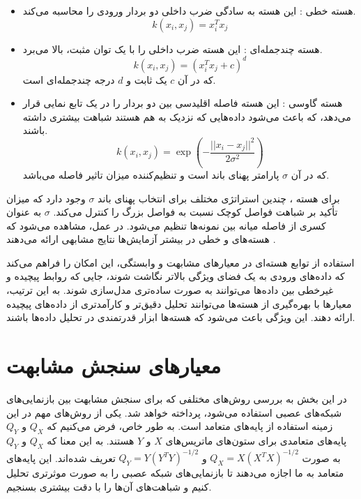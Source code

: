 \begin{itemize}
\item
هسته خطی%
:
این هسته به سادگی ضرب داخلی%
دو بردار ورودی را محاسبه می‌کند.
\begin{equation}
	k(x_i, x_j) = x_i^T x_j
\end{equation}
	
	
	
\item 
هسته چندجمله‌ای%
:
این هسته ضرب داخلی را با یک توان مثبت، بالا می‌برد.
\begin{equation}
	k(x_i, x_j) = (x_i^T x_j + c)^d
\end{equation}
که در آن \( c \) یک ثابت و \( d \) درجه چندجمله‌ای است.

	
\item
هسته گاوسی
%
:
این هسته فاصله اقلیدسی بین دو بردار را در یک تابع نمایی قرار می‌دهد، که باعث می‌شود داده‌هایی که نزدیک به هم هستند شباهت بیشتری داشته باشند.
\begin{equation}
	k(x_i, x_j) = \exp\left(-\frac{||x_i - x_j||^2}{2\sigma^2}\right)
\end{equation}
که در آن \( \sigma \) پارامتر پهنای باند است و تنظیم‌کننده میزان تاثیر فاصله می‌باشد.
\end{itemize}

برای هسته
%
، چندین استراتژی مختلف برای انتخاب پهنای باند \(\sigma\) وجود دارد که میزان تأکید بر شباهت فواصل کوچک نسبت به فواصل بزرگ را کنترل می‌کند. \(\sigma\) به عنوان کسری از فاصله میانه بین نمونه‌ها تنظیم می‌شود. در عمل، مشاهده می‌شود که هسته‌های
و خطی در بیشتر آزمایش‌ها نتایج مشابهی ارائه می‌دهند
\cite{kornblith2019similarity}.

استفاده از توابع هسته‌ای در معیارهای مشابهت و وابستگی، این امکان را فراهم می‌کند که داده‌های ورودی به یک فضای ویژگی بالاتر نگاشت شوند، جایی که روابط پیچیده و غیرخطی بین داده‌ها می‌توانند به صورت ساده‌تری مدل‌سازی شوند. به این ترتیب، معیارها با بهره‌گیری از هسته‌ها می‌توانند تحلیل دقیق‌تر و کارآمدتری از داده‌های پیچیده ارائه دهند. این ویژگی باعث می‌شود که هسته‌ها ابزار قدرتمندی در تحلیل داده‌ها باشند.



\section{معیار‌های سنجش مشابهت}
در این بخش به بررسی روش‌های مختلفی که برای سنجش مشابهت بین بازنمایی‌های شبکه‌های عصبی استفاده می‌شود، پرداخته خواهد شد. یکی از روش‌های مهم در این زمینه استفاده از پایه‌های متعامد است. به طور خاص، فرض می‌کنیم که \( Q_X \) و \( Q_Y \) پایه‌های متعامدی برای ستون‌های ماتریس‌های \( X \) و \( Y \) هستند. به این معنا که \( Q_X \) و \( Q_Y \) به صورت \( Q_X = X(X^T X)^{-1/2} \) و \( Q_Y = Y(Y^T Y)^{-1/2} \) تعریف شده‌اند. این پایه‌های متعامد به ما اجازه می‌دهند تا بازنمایی‌های شبکه عصبی را به صورت موثرتری تحلیل کنیم و شباهت‌های آن‌ها را با دقت بیشتری بسنجیم.


